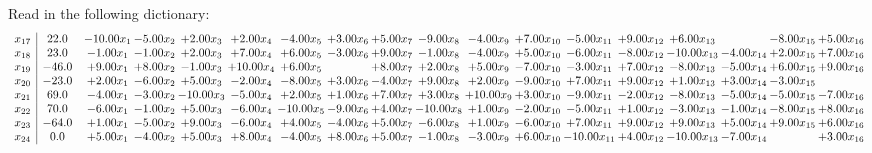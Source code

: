 \documentclass[9pt]{article}
\begin{document}
Read in the following dictionary:
\[\begin{array}{c| c c@{\hskip 2pt} c@{\hskip 2pt} c@{\hskip 2pt} c@{\hskip 2pt} c@{\hskip 2pt} c@{\hskip 2pt} c@{\hskip 2pt} c@{\hskip 2pt} c@{\hskip 2pt} c@{\hskip 2pt} c@{\hskip 2pt} c@{\hskip 2pt} c@{\hskip 2pt} c@{\hskip 2pt} c@{\hskip 2pt} c@{\hskip 2pt} }
 x_{17}   &  22.0 & -10.00 x_{1} & -5.00 x_{2} & +  2.00 x_{3} & +  2.00 x_{4} & -4.00 x_{5} & +  3.00 x_{6} & +  5.00 x_{7} & -9.00 x_{8} & -4.00 x_{9} & +  7.00 x_{10} & -5.00 x_{11} & +  9.00 x_{12} & +  6.00 x_{13} &   & -8.00 x_{15} & +  5.00 x_{16}\\
 x_{18}   &  23.0 & -1.00 x_{1} & -1.00 x_{2} & +  2.00 x_{3} & +  7.00 x_{4} & +  6.00 x_{5} & -3.00 x_{6} & +  9.00 x_{7} & -1.00 x_{8} & -4.00 x_{9} & +  5.00 x_{10} & -6.00 x_{11} & -8.00 x_{12} & -10.00 x_{13} & -4.00 x_{14} & +  2.00 x_{15} & +  7.00 x_{16}\\
 x_{19}   &  -46.0 & +  9.00 x_{1} & +  8.00 x_{2} & -1.00 x_{3} & + 10.00 x_{4} & +  6.00 x_{5} &   & +  8.00 x_{7} & +  2.00 x_{8} & +  5.00 x_{9} & -7.00 x_{10} & -3.00 x_{11} & +  7.00 x_{12} & -8.00 x_{13} & -5.00 x_{14} & +  6.00 x_{15} & +  9.00 x_{16}\\
 x_{20}   &  -23.0 & +  2.00 x_{1} & -6.00 x_{2} & +  5.00 x_{3} & -2.00 x_{4} & -8.00 x_{5} & +  3.00 x_{6} & -4.00 x_{7} & +  9.00 x_{8} & +  2.00 x_{9} & -9.00 x_{10} & +  7.00 x_{11} & +  9.00 x_{12} & +  1.00 x_{13} & +  3.00 x_{14} & -3.00 x_{15} &   \\
 x_{21}   &  69.0 & -4.00 x_{1} & -3.00 x_{2} & -10.00 x_{3} & -5.00 x_{4} & +  2.00 x_{5} & +  1.00 x_{6} & +  7.00 x_{7} & +  3.00 x_{8} & + 10.00 x_{9} & +  3.00 x_{10} & -9.00 x_{11} & -2.00 x_{12} & -8.00 x_{13} & -5.00 x_{14} & -5.00 x_{15} & -7.00 x_{16}\\
 x_{22}   &  70.0 & -6.00 x_{1} & -1.00 x_{2} & +  5.00 x_{3} & -6.00 x_{4} & -10.00 x_{5} & -9.00 x_{6} & +  4.00 x_{7} & -10.00 x_{8} & +  1.00 x_{9} & -2.00 x_{10} & -5.00 x_{11} & +  1.00 x_{12} & -3.00 x_{13} & -1.00 x_{14} & -8.00 x_{15} & +  8.00 x_{16}\\
 x_{23}   &  -64.0 & +  1.00 x_{1} & -5.00 x_{2} & +  9.00 x_{3} & -6.00 x_{4} & +  4.00 x_{5} & -4.00 x_{6} & +  5.00 x_{7} & -6.00 x_{8} & +  1.00 x_{9} & -6.00 x_{10} & +  7.00 x_{11} & +  9.00 x_{12} & +  9.00 x_{13} & +  5.00 x_{14} & +  9.00 x_{15} & +  6.00 x_{16}\\
 x_{24}   &  0.0 & +  5.00 x_{1} & -4.00 x_{2} & +  5.00 x_{3} & +  8.00 x_{4} & -4.00 x_{5} & +  8.00 x_{6} & +  5.00 x_{7} & -1.00 x_{8} & -3.00 x_{9} & +  6.00 x_{10} & -10.00 x_{11} & +  4.00 x_{12} & -10.00 x_{13} & -7.00 x_{14} &   & +  3.00 x_{16}\\

\end{array}\]
\end{document}

